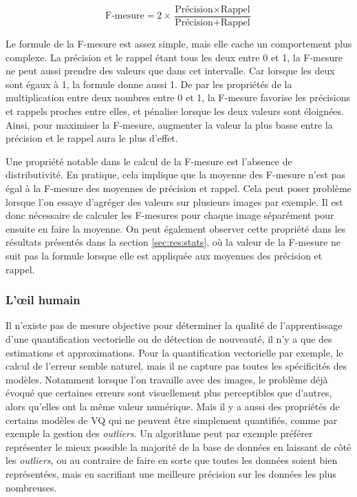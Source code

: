 	\begin{equation}
		\text{F-mesure} = 2 \times \frac{\text{Précision} \times \text{Rappel}}{\text{Précision}+\text{Rappel}}
	\end{equation}

	Le formule de la F-mesure est assez simple, mais elle cache un comportement plus complexe. La précision et le rappel étant tous les deux entre 0 et 1, la F-mesure ne peut aussi prendre des valeurs que dans cet intervalle. Car lorsque les deux sont égaux à 1, la formule donne aussi 1. De par les propriétés de la multiplication entre deux nombres entre 0 et 1, la F-mesure favorise les précisions et rappels proches entre elles, et pénalise lorsque les deux valeurs sont éloignées. Ainsi, pour maximiser la F-mesure, augmenter la valeur la plus basse entre la précision et le rappel aura le plus d'effet.
	
	Une propriété notable dans le calcul de la F-mesure est l'absence de distributivité. En pratique, cela implique que la moyenne des F-mesure n'est pas égal à la F-mesure des moyennes de précision et rappel. Cela peut poser problème lorsque l'on essaye d'agréger des valeurs sur plusieurs images par exemple. Il est donc nécessaire de calculer les F-mesures pour chaque image séparément pour ensuite en faire la moyenne. On peut également observer cette propriété dans les résultats présentés dans la section \ref{sec:res:stats}, où la valeur de la F-mesure ne suit pas la formule lorsque elle est appliquée aux moyennes des précision et rappel.

	\subsubsection{L'œil humain}

	Il n'existe pas de mesure objective pour déterminer la qualité de l'apprentissage d'une quantification vectorielle ou de détection de nouveauté, il n'y a que des estimations et approximations. Pour la quantification vectorielle par exemple, le calcul de l'erreur semble naturel, mais il ne capture pas toutes les spécificités des modèles. Notamment lorsque l'on travaille avec des images, le problème déjà évoqué que certaines erreurs sont visuellement plus perceptibles que d'autres, alors qu'elles ont la même valeur numérique. Mais il y a aussi des propriétés de certains modèles de VQ qui ne peuvent être simplement quantifiés, comme par exemple la gestion des \textit{outliers}. Un algorithme peut par exemple préférer représenter le mieux possible la majorité de la base de données en laissant de côté les \textit{outliers}, ou au contraire de faire en sorte que toutes les données soient bien représentées, mais en sacrifiant une meilleure précision sur les données les plus nombreuses. 
	
